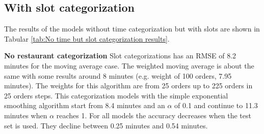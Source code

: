 \subsection{With slot categorization}
The results of the models without time categorization but with slots are shown in Tabular \ref{tab:No time but slot categorization results}.
\begin{table}[h]
\centering
\caption{No time categorization with slots}
\label{tab:No time but slot categorization results}
\end{table}
\newline\newline\textbf{No restaurant categorization}\newline
Slot categorizations has an RMSE of 8.2 minutes for the moving average case. The weighted moving average is about the same with some results around 8 minutes (e.g. weight of 100 orders, 7.95 minutes). The weights for this algorithm are from 25 orders up to 225 orders in 25 orders steps. This categorization models with the simple exponential smoothing algorithm start from 8.4 minutes and an $\alpha$ of 0.1 and continue to 11.3 minutes when $\alpha$ reaches 1. For all models the accuracy decreases when the test set is used. They decline between 0.25 minutes and 0.54 minutes.\newline
